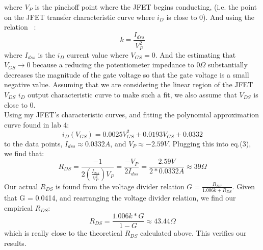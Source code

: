 \documentclass{article}
\begin{document}
    where $V_P$ is the pinchoff point where the JFET begins conducting, (i.e. the point on the JFET transfer characteristic curve where $i_D$ is close to 0). And using the relation ~\cite{lecture}:
    \begin{equation}
        k = \frac{I_{dss}}{V_P^{2}}
    \end{equation}
    where $I_{dss}$ is the $i_D$ current value where $V_{GS} = 0$. And the estimating that $V_{GS} \rightarrow 0$ because a reducing the potentiometer impedance to $0\Omega$ substantially decreases the magnitude of the gate voltage so that the gate voltage is a small negative value. Assuming that we are considering the linear region of the JFET $V_{DS}$ $i_{D}$ output characteristic curve to make such a fit, we also assume that $V_{DS}$ is close to 0.\\\indent Using my JFET's characteristic curves, and fitting the polynomial approximation curve found in lab 4:
    \begin{equation}
        i_D(V_{GS}) = 0.0025V_{GS}^{2} + 0.0193V_{GS} + 0.0332
    \end{equation}
    to the data points, $I_{dss} \approx 0.0332 A$, and $V_P \approx -2.59 V$. Plugging this into eq.(3), we find that:
    \begin{equation}
        R_{DS} = \frac{-1}{2(\frac{I_{dss}}{V_P^{2}}) V_P} = \frac{-V_P}{2 I_{dss}} = \frac{2.59 V}{2*0.0332 A} \approx 39 \Omega
    \end{equation}
    Our actual $R_{DS}$ is found from the voltage divider relation $G = \frac{R_{DS}}{1.006k + R_{DS}}$. Given that G = 0.0414, and rearranging the voltage divider relation, we find our empirical $R_{DS}$:
    \begin{equation}
        R_{DS} = \frac{1.006k * G}{1 - G} \approx 43.44 \Omega
    \end{equation}
    which is really close to the theoretical $R_{DS}$ calculated above. This verifies our results.
\end{document}
